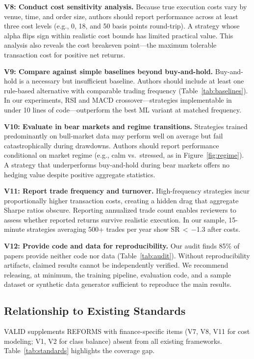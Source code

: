\documentclass[preprint,12pt,authoryear]{elsarticle}
\begin{document}
\textbf{V8: Conduct cost sensitivity analysis.}
Because true execution costs vary by venue, time, and order size, authors should report performance across at least three cost levels (e.g., 0, 18, and 50 basis points round-trip). A strategy whose alpha flips sign within realistic cost bounds has limited practical value. This analysis also reveals the cost breakeven point---the maximum tolerable transaction cost for positive net returns.

\textbf{V9: Compare against simple baselines beyond buy-and-hold.}
Buy-and-hold is a necessary but insufficient baseline. Authors should include at least one rule-based alternative with comparable trading frequency (Table~\ref{tab:baselines}). In our experiments, RSI and MACD crossover---strategies implementable in under 10 lines of code---outperform the best ML variant at matched frequency.

\textbf{V10: Evaluate in bear markets and regime transitions.}
Strategies trained predominantly on bull-market data may perform well on average but fail catastrophically during drawdowns. Authors should report performance conditional on market regime (e.g., calm vs.\ stressed, as in Figure~\ref{fig:regime}). A strategy that underperforms buy-and-hold during bear markets offers no hedging value despite positive aggregate statistics.

\textbf{V11: Report trade frequency and turnover.}
High-frequency strategies incur proportionally higher transaction costs, creating a hidden drag that aggregate Sharpe ratios obscure. Reporting annualized trade count enables reviewers to assess whether reported returns survive realistic execution. In our sample, 15-minute strategies averaging 500+ trades per year show SR\,$<$\,$-$1.3 after costs.

\textbf{V12: Provide code and data for reproducibility.}
Our audit finds 85\% of papers provide neither code nor data (Table~\ref{tab:audit}). Without reproducibility artifacts, claimed results cannot be independently verified. We recommend releasing, at minimum, the training pipeline, evaluation code, and a sample dataset or synthetic data generator sufficient to reproduce the main results.

\subsection{Relationship to Existing Standards}

VALID supplements REFORMS with finance-specific items (V7, V8, V11 for cost modeling; V1, V2 for class balance) absent from all existing frameworks. Table~\ref{tab:standards} highlights the coverage gap.
\end{document}
